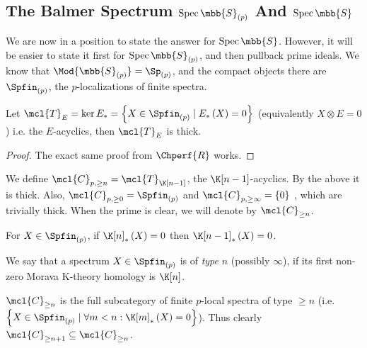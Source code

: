 \subsection{The Balmer Spectrum $\spec \mbb{S}_{\left(p\right)}$ And $\spec \mbb{S}$}

We are now in a position to state the answer for $\spec \mbb{S}$.
However, it will be easier to state it first for $\spec \mbb{S}_{\left(p\right)}$, and then pullback prime ideals.
We know that $\Mod{\mbb{S}_{\left(p\right)}} = \Sp_{\left(p\right)}$, and the compact objects there are $\Spfin_{\left(p\right)}$, the $p$-localizations of finite spectra.

\begin{proposition}
	Let
	$
	\mcl{T}_E
	= \ker E_*
	= \left\{ X \in \Spfin_{\left(p\right)} \mid E_{*}\left(X\right)=0 \right\}$
	(equivalently $X \otimes E = 0$) i.e. the $E$-acyclics, then $\mcl{T}_E$ is thick.
\end{proposition}

\begin{proof}
	The exact same proof from $\Chperf{R}$ works.
\end{proof}

\begin{definition}
	We define $\mcl{C}_{p, \geq n} = \mcl{T}_{\K[n-1]}$, the $\K[n-1]$-acyclics.
	By the above it is thick.
	Also, $\mcl{C}_{p, \geq 0} = \Spfin_{\left(p\right)}$ and $\mcl{C}_{p, \geq\infty} = \left\{ 0\right\}$ , which are trivially thick.
	When the prime is clear, we will denote by $\mcl{C}_{\geq n}$.
\end{definition}

\begin{proposition}
	For $X \in \Spfin_{\left(p\right)}$, if $\K[n]_{*}\left(X\right) = 0$ then $\K[n-1]_*\left(X\right) = 0$.
\end{proposition}

\begin{definition}
	We say that a spectrum $X \in \Spfin_{\left(p\right)}$ is of \emph{type} $n$ (possibly $\infty$), if its first non-zero Morava K-theory homology is $\K[n]$.
\end{definition}

\begin{corollary}
	$\mcl{C}_{\geq n}$ is the full subcategory of finite $p$-local spectra of type $\geq n$ (i.e. $\left\{ X \in \Spfin_{\left(p\right)} \mid \forall m<n: \K[m]_*\left(X\right) = 0 \right\}$).
	Thus clearly $\mcl{C}_{\geq n+1} \subseteq \mcl{C}_{\geq n}$.
\end{corollary}

